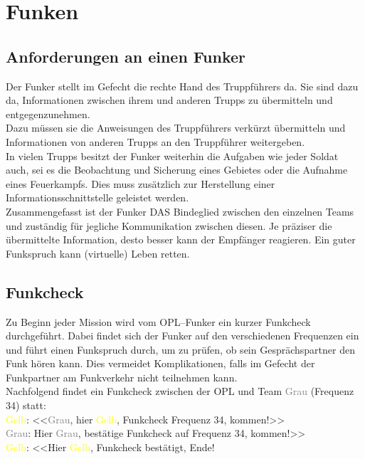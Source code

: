 \newpage
\section{Funken}
\label{Funken}
\subsection{Anforderungen an einen Funker}
Der Funker stellt im Gefecht die rechte Hand des Truppführers da. Sie sind dazu da,
Informationen zwischen ihrem und anderen Trupps zu übermitteln und
entgegenzunehmen. \\
Dazu müssen sie die Anweisungen des Truppführers verkürzt
übermitteln und Informationen von anderen Trupps an den Truppführer weitergeben. \\
In vielen Trupps besitzt der Funker weiterhin die Aufgaben wie jeder Soldat auch, sei es
die Beobachtung und Sicherung eines Gebietes oder die Aufnahme eines Feuerkampfs.
Dies muss zusätzlich zur Herstellung einer Informationsschnittstelle geleistet werden. \\
Zusammengefasst ist der Funker DAS Bindeglied zwischen den einzelnen Teams und
zuständig für jegliche Kommunikation zwischen diesen. Je präziser die übermittelte
Information, desto besser kann der Empfänger reagieren. Ein guter Funkspruch kann
(virtuelle) Leben retten. \\

\subsection{Funkcheck}
Zu Beginn jeder Mission wird vom \ac{OPL}–Funker ein kurzer Funkcheck durchgeführt.
Dabei findet sich der Funker auf den verschiedenen Frequenzen ein und führt einen
Funkspruch durch, um zu prüfen, ob sein Gesprächspartner den Funk hören kann. Dies
vermeidet Komplikationen, falls im Gefecht der Funkpartner am Funkverkehr nicht
teilnehmen kann. \\
Nachfolgend findet ein Funkcheck zwischen der \ac{OPL} und Team \textcolor{gray}{Grau} (Frequenz 34) statt: \\
\textcolor{yellow}{Gelb}: <<\textcolor{gray}{Grau}, hier \textcolor{yellow}{Gelb}, Funkcheck Frequenz 34, kommen!>> \\
\textcolor{gray}{Grau}: Hier \textcolor{gray}{Grau}, bestätige Funkcheck auf Frequenz 34, kommen!>> \\
\textcolor{yellow}{Gelb}: <<Hier \textcolor{yellow}{Gelb}, Funkcheck bestätigt, Ende! \\
